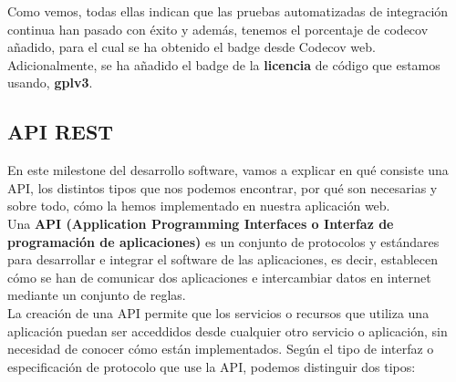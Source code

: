 Como vemos, todas ellas indican que las pruebas automatizadas de integración continua han
pasado con éxito y además, tenemos el porcentaje de codecov añadido, para el cual se ha
obtenido el badge desde Codecov web. Adicionalmente, se ha añadido el badge de la
\textbf{licencia} de código que estamos usando, \textbf{gplv3}.

\subsection{API REST}
En este milestone del desarrollo software, vamos a explicar en qué consiste una API, los
distintos tipos que nos podemos encontrar, por qué son necesarias y sobre todo, cómo la
hemos implementado en nuestra aplicación web.\\

Una \textbf{API \cite{api} (Application Programming Interfaces o Interfaz de programación
de aplicaciones)} es un conjunto de protocolos y estándares para desarrollar e integrar el
software de las aplicaciones, es decir, establecen cómo se han de comunicar dos
aplicaciones e intercambiar datos en internet mediante un conjunto de reglas.\\

La creación de una API permite que los servicios o recursos que utiliza una aplicación
puedan ser acceddidos desde cualquier otro servicio o aplicación, sin necesidad de
conocer cómo están implementados. Según el tipo de interfaz o especificación de protocolo
que use la API, podemos distinguir dos tipos:

